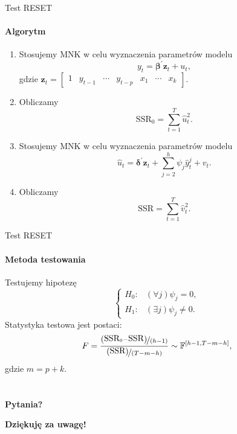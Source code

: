 \documentclass[a4paper, 11pt]{beamer}
\begin{document}
	\begin{frame}{Test RESET}
		\framesubtitle{Algorytm}
		\begin{enumerate}
			\item Stosujemy MNK w celu wyznaczenia parametrów modelu \[
					y_t = \boldsymbol{\beta}^{\prime} \boldsymbol{z}_t + u_t,
				\] gdzie $\boldsymbol{z}_{t} = \left[\begin{matrix}1 & y_{t-1} & \cdots & y_{t-p} & x_{1} & \cdots & x_{k}\end{matrix}\right].$
			\item Obliczamy \[
				\mbox{SSR}_0 = \sum_{t=1}^{T} \hat{u}_t^2.
			\]
			\item Stosujemy MNK w celu wyznaczenia parametrów modelu \[
					\hat{u}_t = \boldsymbol{\delta}^{\prime} \boldsymbol{z}_t + \sum_{j=2}^{h} \psi_j \hat{y}_t^j + v_t.
				\]
			\item Obliczamy \[
				\mbox{SSR} = \sum_{t=1}^{T} \hat{v}_t^2.
			\]
		\end{enumerate}
	\end{frame}
	
	\begin{frame}{Test RESET}
		\framesubtitle{Metoda testowania}
		Testujemy hipotezę \[
			\begin{cases}
				H_{0}: & \left(\forall j\right)\psi_{j}=0,\\
				H_{1}: & \left(\exists j\right)\psi_{j}\neq0.
			\end{cases}
		\]
		Statystyka testowa jest postaci: \[
			F=\frac{
				\nicefrac{\left(\mbox{SSR}_0 - \mbox{SSR}\right)}{\left(h-1\right)}
			}{
				\nicefrac{\left(\mbox{SSR}\right)}{\left(T-m-h\right)}
			} \sim \mathbb{F}^{\left[h-1, T-m-h\right]},
		\] gdzie $m=p+k.$
	\end{frame}
	
	\section*{}
	
	\begin{frame}
		\center
		\Huge \bfseries
		Pytania?
	\end{frame}

	\begin{frame}
		\center
		\Huge \bfseries
		Dziękuję za uwagę!
	\end{frame}
\end{document}
